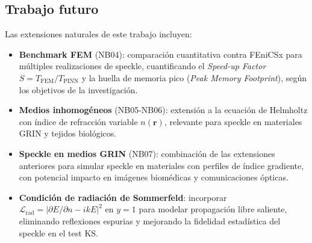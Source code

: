 \subsection*{Trabajo futuro}

Las extensiones naturales de este trabajo incluyen:

\begin{itemize}
  \item \textbf{Benchmark FEM} (NB04): comparación cuantitativa contra FEniCSx para
    múltiples realizaciones de speckle, cuantificando el \textit{Speed-up Factor}
    $S = T_{\mathrm{FEM}} / T_{\mathrm{PINN}}$ \citep{Thuerey2021_PBDL} y la
    huella de memoria pico (\textit{Peak Memory Footprint}), según los objetivos
    de la investigación.

  \item \textbf{Medios inhomogéneos} (NB05-NB06): extensión a la ecuación de Helmholtz
    con índice de refracción variable $n(\mathbf{r})$, relevante para speckle en
    materiales GRIN y tejidos biológicos.

  \item \textbf{Speckle en medios GRIN} (NB07): combinación de las extensiones anteriores
    para simular speckle en materiales con perfiles de índice gradiente,
    con potencial impacto en imágenes biomédicas y comunicaciones ópticas.

  \item \textbf{Condición de radiación de Sommerfeld}: incorporar
    $\mathcal{L}_{\mathrm{rad}} = |\partial E/\partial n - ikE|^2$
    en $y = 1$ para modelar propagación libre saliente, eliminando reflexiones espurias
    y mejorando la fidelidad estadística del speckle en el test KS.
\end{itemize}
